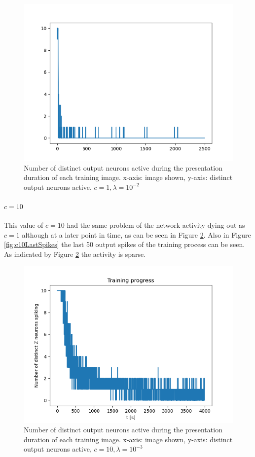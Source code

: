 \begin{figure}
  \includegraphics[width=\linewidth]{figures/angleNetwork/c1Distinct.png}
  \caption{Number of distinct output neurons active during the presentation duration of each training image. x-axis: image shown, y-axis: distinct output neurons active, $c = 1, \lambda = 10^{-2}$}
  \label{fig:c1Distinct}
\end{figure}

\paragraph{$c = 10$}
This value of $c = 10$ had the same problem of the network activity dying out as $c = 1$ although at a later point in time, as can be seen in Figure \ref{fig:c10Distinct}. Also in Figure \ref{fig:c10LastSpikes} the last 50 output spikes of the training process can be seen. As indicated by Figure \ref{fig:c10Distinct} the activity is sparse.

\begin{figure}
  \includegraphics[width=\linewidth]{figures/angleNetwork/c10_3distinctZ.png}
  \caption{Number of distinct output neurons active during the presentation duration of each training image. x-axis: image shown, y-axis: distinct output neurons active, $c = 10, \lambda = 10^{-3}$}
  \label{fig:c10Distinct}
\end{figure}

